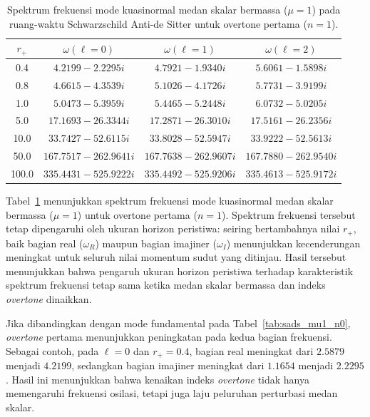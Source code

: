\begin{table}[H]
\centering
\caption{Spektrum frekuensi mode kuasinormal medan skalar bermassa ($\mu=1$) pada ruang-waktu Schwarzschild Anti-de Sitter untuk overtone pertama ($n=1$).}
\vspace{0.2cm}
\renewcommand{\arraystretch}{1.25}
\begin{tabular}{cccc}
\toprule
$r_+$ & $\omega(\ell=0)$ & $\omega(\ell=1)$ & $\omega(\ell=2)$ \\
\midrule
0.4   & $4.2199 - 2.2295i$ & $4.7921 - 1.9340i$ & $5.6061 - 1.5898i$ \\
0.8   & $4.6615 - 4.3539i$ & $5.1026 - 4.1726i$ & $5.7731 - 3.9199i$ \\
1.0   & $5.0473 - 5.3959i$ & $5.4465 - 5.2448i$ & $6.0732 - 5.0205i$ \\
5.0   & $17.1693 - 26.3344i$ & $17.2871 - 26.3010i$ & $17.5161 - 26.2356i$ \\
10.0  & $33.7427 - 52.6115i$ & $33.8028 - 52.5947i$ & $33.9222 - 52.5613i$ \\
50.0  & $167.7517 - 262.9641i$ & $167.7638 - 262.9607i$ & $167.7880 - 262.9540i$ \\
100.0 & $335.4431 - 525.9222i$ & $335.4492 - 525.9206i$ & $335.4613 - 525.9172i$ \\
\bottomrule
\end{tabular}
\label{tab:sads_mu1_n1}
\end{table}

Tabel~\ref{tab:sads_mu1_n1} menunjukkan spektrum frekuensi mode kuasinormal medan skalar bermassa ($\mu=1$) untuk overtone pertama ($n=1$). Spektrum frekuensi tersebut tetap dipengaruhi oleh ukuran horizon peristiwa: seiring bertambahnya nilai $r_+$, baik bagian real ($\omega_R$) maupun bagian imajiner ($\omega_I$) menunjukkan kecenderungan meningkat untuk seluruh nilai momentum sudut yang ditinjau. Hasil tersebut menunjukkan bahwa pengaruh ukuran horizon peristiwa terhadap karakteristik spektrum frekuensi tetap sama ketika medan skalar bermassa dan indeks \textit{overtone} dinaikkan.

Jika dibandingkan dengan mode fundamental pada Tabel~\ref{tab:sads_mu1_n0}, \textit{overtone} pertama menunjukkan peningkatan pada kedua bagian frekuensi. Sebagai contoh, pada $\ell=0$ dan $r_+=0.4$, bagian real meningkat dari $2.5879$ menjadi $4.2199$, sedangkan bagian imajiner meningkat dari $1.1654$ menjadi $2.2295$. Hasil ini menunjukkan bahwa kenaikan indeks \textit{overtone} tidak hanya memengaruhi frekuensi osilasi, tetapi juga laju peluruhan perturbasi medan skalar.

